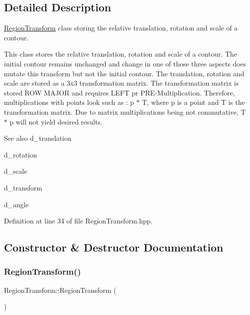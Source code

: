 \subsection{Detailed Description}
\mbox{\hyperlink{class_region_transform}{Region\+Transform}} class storing the relative translation, rotation and scale of a contour. 

This class stores the relative translation, rotation and scale of a contour. The initial contour remains unchanged and change in one of those three aspects does mutate this transform but not the initial contour. The translation, rotation and scale are stored as a 3x3 transformation matrix. The transformation matrix is stored R\+OW M\+A\+J\+OR and requires L\+E\+FT pr P\+R\+E-\/\+Multiplication. Therefore, multiplications with points look such as \+: p $\ast$ T, where p is a point and T is the transformation matrix. Due to matrix multiplications being not commutative, T $\ast$ p will not yield desired results.

\begin{DoxySeeAlso}{See also}
d\+\_\+translation 

d\+\_\+rotation 

d\+\_\+scale 

d\+\_\+transform 

d\+\_\+angle 
\end{DoxySeeAlso}


Definition at line 34 of file Region\+Transform.\+hpp.



\subsection{Constructor \& Destructor Documentation}
\mbox{\label{class_region_transform_aafca68cc04b354ff4a5a6e7d341af492}} 
\subsubsection{\texorpdfstring{RegionTransform()}{RegionTransform()}}
{\footnotesize\ttfamily Region\+Transform\+::\+Region\+Transform (\begin{DoxyParamCaption}{ }\end{DoxyParamCaption})}




